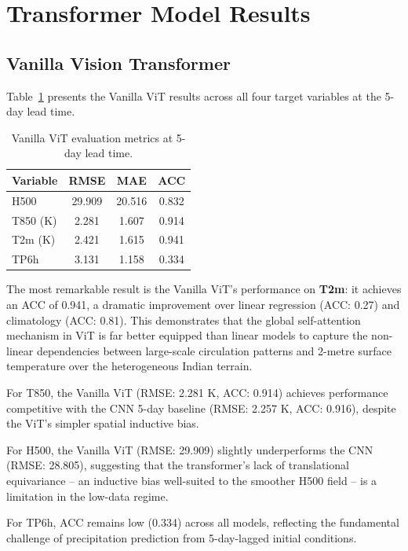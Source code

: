 \documentclass[12pt,a4paper,oneside]{report}
\begin{document}
\section{Transformer Model Results}

\subsection{Vanilla Vision Transformer}

Table~\ref{tab:vit} presents the Vanilla ViT results across all four target variables at the 5-day lead time.

\begin{table}[H]
\centering
\caption{Vanilla ViT evaluation metrics at 5-day lead time.}
\label{tab:vit}
\begin{tabular}{lccc}
\toprule
\textbf{Variable} & \textbf{RMSE} & \textbf{MAE} & \textbf{ACC} \\
\midrule
H500    & 29.909 & 20.516 & 0.832 \\
T850 (K) & 2.281  & 1.607  & 0.914 \\
T2m (K)  & 2.421  & 1.615  & 0.941 \\
TP6h    & 3.131  & 1.158  & 0.334 \\
\bottomrule
\end{tabular}
\end{table}

The most remarkable result is the Vanilla ViT's performance on \textbf{T2m}: it achieves an ACC of 0.941, a dramatic improvement over linear regression (ACC: 0.27) and climatology (ACC: 0.81). This demonstrates that the global self-attention mechanism in ViT is far better equipped than linear models to capture the non-linear dependencies between large-scale circulation patterns and 2-metre surface temperature over the heterogeneous Indian terrain.

For T850, the Vanilla ViT (RMSE: 2.281 K, ACC: 0.914) achieves performance competitive with the CNN 5-day baseline (RMSE: 2.257 K, ACC: 0.916), despite the ViT's simpler spatial inductive bias.

For H500, the Vanilla ViT (RMSE: 29.909) slightly underperforms the CNN (RMSE: 28.805), suggesting that the transformer's lack of translational equivariance -- an inductive bias well-suited to the smoother H500 field -- is a limitation in the low-data regime.

For TP6h, ACC remains low (0.334) across all models, reflecting the fundamental challenge of precipitation prediction from 5-day-lagged initial conditions.
\end{document}

